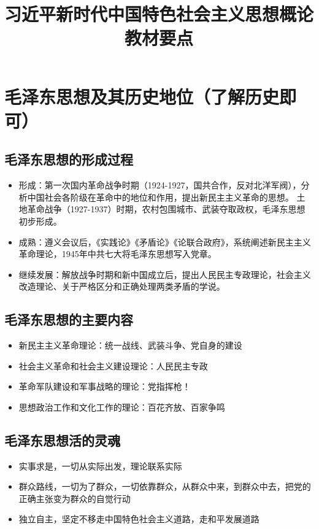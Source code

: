 \documentclass[a4paper, UTF8]{ctexart}
\title{\huge{\heiti 习近平新时代中国特色社会主义思想概论\protect\\教材要点}}
\author{}
\date{}
\begin{document}
\maketitle

\section{毛泽东思想及其历史地位（了解历史即可）}
    \subsection{毛泽东思想的形成过程}
    \begin{itemize}
        \item 形成：第一次国内革命战争时期（1924-1927，国共合作，反对北洋军阀），分析中国社会各阶级在革命中的地位和作用，提出新民主主义革命的思想。
        土地革命战争（1927-1937）时期，农村包围城市、武装夺取政权，毛泽东思想初步形成。
        \item 成熟：遵义会议后，《实践论》《矛盾论》《论联合政府》，系统阐述新民主主义革命理论，1945年中共七大将毛泽东思想写入党章。
        \item 继续发展：解放战争时期和新中国成立后，提出人民民主专政理论，社会主义改造理论、关于严格区分和正确处理两类矛盾的学说。
    \end{itemize}

    \subsection{毛泽东思想的主要内容}
    \begin{itemize}
        \item 新民主主义革命理论：统一战线、武装斗争、党自身的建设
        \item 社会主义革命和社会主义建设理论：人民民主专政
        \item 革命军队建设和军事战略的理论：党指挥枪！
        \item 思想政治工作和文化工作的理论：百花齐放、百家争鸣
    \end{itemize}

    \subsection{毛泽东思想活的灵魂}
    \begin{itemize}
        \item 实事求是，一切从实际出发，理论联系实际
        \item 群众路线，一切为了群众，一切依靠群众，从群众中来，到群众中去，把党的正确主张变为群众的自觉行动
        \item 独立自主，坚定不移走中国特色社会主义道路，走和平发展道路
    \end{itemize}
\end{document}
